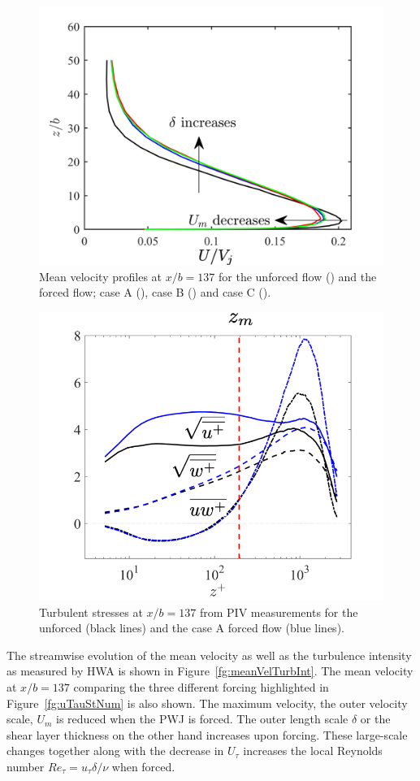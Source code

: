 \begin{figure}[h]
	\centering
	\includegraphics[width=.65\textwidth]{pics/meanVel137.png}
	\caption{Mean velocity profiles at $x/b = 137$ for the unforced flow (\textcolor{black}{\full}) and the forced flow; case A (\textcolor{blue}{\full}), case B (\textcolor{red}{\full}) and case C (\textcolor{green}{\full}).}
	\label{fg:meanVel137}
\end{figure}

\begin{figure}[h!]
	\centering
	\includegraphics[width=.65\textwidth]{pics/turbInt137.png}
	\caption{Turbulent stresses at $x/b=137$ from PIV measurements for the unforced (black lines) and the case A forced flow (blue lines).}
	\label{fg:turbInt137}
\end{figure}

The streamwise evolution of the mean velocity as well as the turbulence intensity as measured by HWA is shown in Figure~\ref{fg:meanVelTurbInt}. The mean velocity at $x/b=137$ comparing the three different forcing highlighted in Figure~\ref{fg:uTauStNum} is also shown. The maximum velocity, the outer velocity scale, $U_m$ is reduced when the PWJ is forced. The outer length scale $\delta$ or the shear layer thickness on the other hand increases upon forcing. These large-scale changes together along with the decrease in $U_\tau$ increases the local Reynolds number $Re_\tau=u_\tau \delta/\nu$ when forced. 


